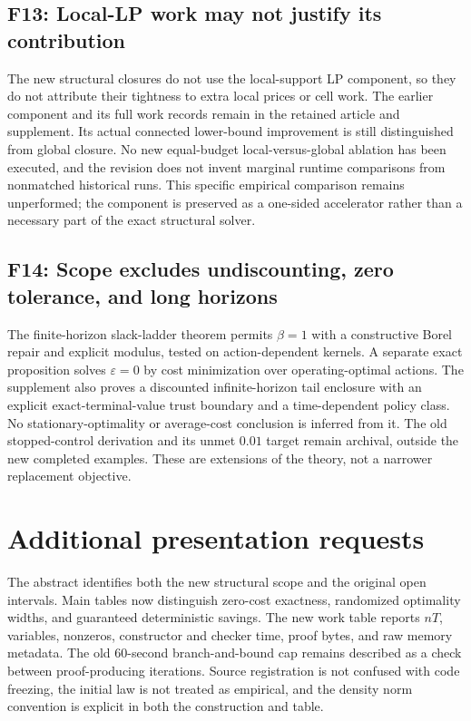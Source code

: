 \subsection*{F13: Local-LP work may not justify its contribution}
The new structural closures do not use the local-support LP component, so they do not attribute their tightness to extra local prices or cell work. The earlier component and its full work records remain in the retained article and supplement. Its actual connected lower-bound improvement is still distinguished from global closure. No new equal-budget local-versus-global ablation has been executed, and the revision does not invent marginal runtime comparisons from nonmatched historical runs. This specific empirical comparison remains unperformed; the component is preserved as a one-sided accelerator rather than a necessary part of the exact structural solver.

\subsection*{F14: Scope excludes undiscounting, zero tolerance, and long horizons}
The finite-horizon slack-ladder theorem permits $\beta=1$ with a constructive Borel repair and explicit modulus, tested on action-dependent kernels. A separate exact proposition solves $\varepsilon=0$ by cost minimization over operating-optimal actions. The supplement also proves a discounted infinite-horizon tail enclosure with an explicit exact-terminal-value trust boundary and a time-dependent policy class. No stationary-optimality or average-cost conclusion is inferred from it. The old stopped-control derivation and its unmet $0.01$ target remain archival, outside the new completed examples. These are extensions of the theory, not a narrower replacement objective.

\section{Additional presentation requests}
The abstract identifies both the new structural scope and the original open intervals. Main tables now distinguish zero-cost exactness, randomized optimality widths, and guaranteed deterministic savings. The new work table reports $nT$, variables, nonzeros, constructor and checker time, proof bytes, and raw memory metadata. The old 60-second branch-and-bound cap remains described as a check between proof-producing iterations. Source registration is not confused with code freezing, the initial law is not treated as empirical, and the density norm convention is explicit in both the construction and table.

